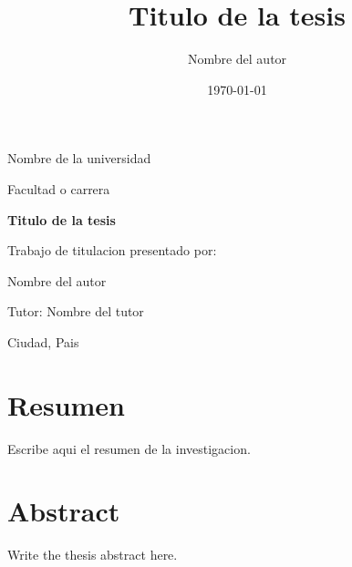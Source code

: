\documentclass[12pt,letterpaper,oneside]{report}
\title{Titulo de la tesis}
\author{Nombre del autor}
\date{\today}
\begin{document}
\begin{titlepage}
  \centering
  {\Large Nombre de la universidad\par}
  \vspace{1cm}
  {\large Facultad o carrera\par}
  \vspace{2cm}
  {\bfseries\Large Titulo de la tesis\par}
  \vspace{2cm}
  {\large Trabajo de titulacion presentado por:\par}
  \vspace{0.5cm}
  {\large Nombre del autor\par}
  \vfill
  {\large Tutor: Nombre del tutor\par}
  \vspace{1cm}
  {\large Ciudad, Pais\par}
  {\large \the\year\par}
\end{titlepage}

\chapter*{Resumen}
Escribe aqui el resumen de la investigacion.

\chapter*{Abstract}
Write the thesis abstract here.

\tableofcontents
\listoffigures
\listoftables

\clearpage
{}







\printbibliography[heading=bibintoc,title={Referencias}]

\appendix

\end{document}
